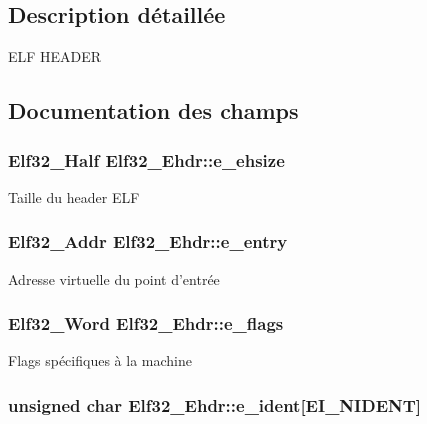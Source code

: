 \subsection{Description détaillée}
E\-L\-F H\-E\-A\-D\-E\-R 

\subsection{Documentation des champs}
\hypertarget{structElf32__Ehdr_a04c658023e50479eed64f6d1b00a2504}{
\subsubsection[{e\-\_\-ehsize}]{\setlength{\rightskip}{0pt plus 5cm}Elf32\-\_\-\-Half Elf32\-\_\-\-Ehdr\-::e\-\_\-ehsize}}\label{structElf32__Ehdr_a04c658023e50479eed64f6d1b00a2504}
Taille du header E\-L\-F \hypertarget{structElf32__Ehdr_ab8a982696048d807017919b7d0145482}{
\subsubsection[{e\-\_\-entry}]{\setlength{\rightskip}{0pt plus 5cm}Elf32\-\_\-\-Addr Elf32\-\_\-\-Ehdr\-::e\-\_\-entry}}\label{structElf32__Ehdr_ab8a982696048d807017919b7d0145482}
Adresse virtuelle du point d'entrée \hypertarget{structElf32__Ehdr_a87cf481be7917fafde0c4ecf78c8e574}{
\subsubsection[{e\-\_\-flags}]{\setlength{\rightskip}{0pt plus 5cm}Elf32\-\_\-\-Word Elf32\-\_\-\-Ehdr\-::e\-\_\-flags}}\label{structElf32__Ehdr_a87cf481be7917fafde0c4ecf78c8e574}
Flags spécifiques à la machine \hypertarget{structElf32__Ehdr_aba47ac5e0af02d5668782f1fd5a7466c}{
\subsubsection[{e\-\_\-ident}]{\setlength{\rightskip}{0pt plus 5cm}unsigned char Elf32\-\_\-\-Ehdr\-::e\-\_\-ident\mbox{[}E\-I\-\_\-\-N\-I\-D\-E\-N\-T\mbox{]}}}\label{structElf32__Ehdr_aba47ac5e0af02d5668782f1fd5a7466c}
